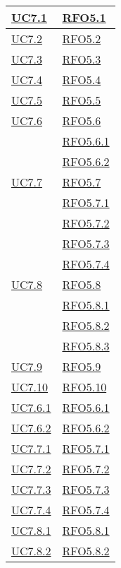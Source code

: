 \begin{longtable}{|>{\centering}m{5cm}|m{5cm}<{\centering}|}
\hyperlink{UC7.1}{UC7.1} & \hyperlink{RFO5.1}{RFO5.1}\\\hline
\hyperlink{UC7.2}{UC7.2} & \hyperlink{RFO5.2}{RFO5.2}\\\hline
\hyperlink{UC7.3}{UC7.3} & \hyperlink{RFO5.3}{RFO5.3}\\\hline
\hyperlink{UC7.4}{UC7.4} & \hyperlink{RFO5.4}{RFO5.4}\\\hline
\hyperlink{UC7.5}{UC7.5} & \hyperlink{RFO5.5}{RFO5.5}\\\hline
\hyperlink{UC7.6}{UC7.6} & \hyperlink{RFO5.6}{RFO5.6}\\
& \hyperlink{RFO5.6.1}{RFO5.6.1}\\
& \hyperlink{RFO5.6.2}{RFO5.6.2}\\\hline

\hyperlink{UC7.7}{UC7.7} & \hyperlink{RFO5.7}{RFO5.7}\\
& \hyperlink{RFO5.7.1}{RFO5.7.1}\\
& \hyperlink{RFO5.7.2}{RFO5.7.2}\\
& \hyperlink{RFO5.7.3}{RFO5.7.3}\\
& \hyperlink{RFO5.7.4}{RFO5.7.4}\\\hline
\hyperlink{UC7.8}{UC7.8} & \hyperlink{RFO5.8}{RFO5.8}\\
& \hyperlink{RFO5.8.1}{RFO5.8.1}\\
& \hyperlink{RFO5.8.2}{RFO5.8.2}\\
& \hyperlink{RFO5.8.3}{RFO5.8.3}\\\hline
\hyperlink{UC7.9}{UC7.9} & \hyperlink{RFO5.9}{RFO5.9}\\\hline
\hyperlink{UC7.10}{UC7.10} & \hyperlink{RFO5.10}{RFO5.10}\\\hline
\hyperlink{UC7.6.1}{UC7.6.1} & \hyperlink{RFO5.6.1}{RFO5.6.1}\\\hline
\hyperlink{UC7.6.2}{UC7.6.2} & \hyperlink{RFO5.6.2}{RFO5.6.2}\\\hline
\hyperlink{UC7.7.1}{UC7.7.1} & \hyperlink{RFO5.7.1}{RFO5.7.1}\\\hline
\hyperlink{UC7.7.2}{UC7.7.2} & \hyperlink{RFO5.7.2}{RFO5.7.2}\\\hline
\hyperlink{UC7.7.3}{UC7.7.3} & \hyperlink{RFO5.7.3}{RFO5.7.3}\\\hline
\hyperlink{UC7.7.4}{UC7.7.4} & \hyperlink{RFO5.7.4}{RFO5.7.4}\\\hline
\hyperlink{UC7.8.1}{UC7.8.1} & \hyperlink{RFO5.8.1}{RFO5.8.1}\\\hline
\hyperlink{UC7.8.2}{UC7.8.2} & \hyperlink{RFO5.8.2}{RFO5.8.2}\\\hline

\end{longtable}
